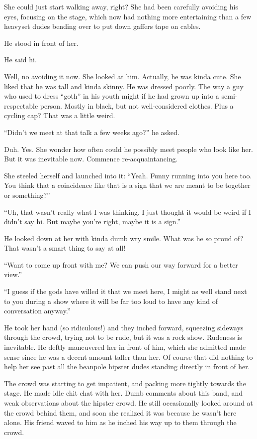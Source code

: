 \documentclass[letterpaper]{article}
\begin{document}
She could just start walking away, right? She had been carefully avoiding his eyes, focusing on the stage, which now had nothing more entertaining than a few heavyset dudes bending over to put down gaffers tape on cables.

He stood in front of her. 

He said hi.

Well, no avoiding it now. She looked at him.
Actually, he was kinda cute. She liked that he was tall and kinda skinny. 
He was dressed poorly. 
The way a guy who used to dress ``goth'' in his youth might if he had grown up into a semi-respectable person. Mostly in black, but not well-considered clothes. Plus a cycling cap? That was a little weird.

``Didn't we meet at that talk a few weeks ago?'' he asked.

Duh. Yes. She wonder how often could he possibly meet people who look like her.
But it was inevitable now.
Commence re-acquaintancing. 

She steeled herself and launched into it: ``Yeah. Funny running into you here too. You think that a coincidence like that is a sign that we are meant to be together or something?''

``Uh, that wasn't really what I was thinking. I just thought it would be weird if I didn't say hi. But maybe you're right, maybe it is a sign.''

He looked down at her with kinda dumb wry smile.
What was he so proud of? That wasn't a smart thing to say at all!

``Want to come up front with me? We can push our way forward for a better view.''

``I guess if the gods have willed it that we meet here, I might as well stand next to you during a show where it will be far too loud to have any kind of conversation anyway.''

He took her hand (so ridiculous!) and they inched forward, squeezing sideways through the crowd, trying not to be rude, but it was a rock show. Rudeness is inevitable.
He deftly maneuvered her in front of him, which she admitted made sense since he was a decent amount taller than her.
Of course that did nothing to help her see past all the beanpole hipster dudes standing directly in front of her.

The crowd was starting to get impatient, and packing more tightly towards the stage. He made idle chit chat with her.
Dumb comments about this band, and weak observations about the hipster crowd.
He still occasionally looked around at the crowd behind them, and soon she realized it was because he wasn't here alone. His friend waved to him as he inched his way up to them through the crowd.
\end{document}
